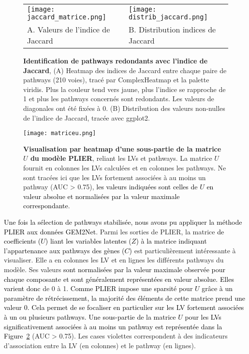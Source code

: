 \documentclass[twoside]{article}
\newcommand{\AR}[1]{\textcolor{black}{#1}}
\begin{document}
    \begin{figure}[!h]
    \centering
        \begin{tabular}{p{100mm}p{70mm}}
        \texttt{[image: jaccard\_matrice.png]} &
        \texttt{[image: distrib\_jaccard.png]} \\
        \centering A. Valeurs de l'indice de Jaccard & \centering B. Distribution indices de Jaccard\\[6pt]
        \end{tabular}
        \caption[Identification de pathways redondants avec l'indice de Jaccard]{\textbf{Identification de pathways redondants avec l'indice de Jaccard}, (A) Heatmap des indices de Jaccard entre chaque paire de pathways (210 voies), tracé par ComplexHeatmap \cite{gu_complex_2016} et la palette viridis. Plus la couleur tend vers jaune, plus l'indice se rapproche de 1 et plus les pathways concernés sont redondants. Les valeurs de diagonales ont été fixées à 0. (B) Distribution des valeurs non-nulles de l'indice de Jaccard, tracée avec ggplot2. \label{fig:jacc}}
    \end{figure}

    \begin{figure}[!h]
    \centering
        \texttt{[image: matriceu.png]}
        \caption[Coefficients PLIER liant les variables latentes aux pathways]{\textbf{Visualisation par heatmap d'une sous-partie de la matrice $U$ du modèle PLIER}, reliant les LVs et pathways. La matrice $U$ fournit en colonnes les LVs calculées et en colonnes les pathways. Ne sont tracées ici que les LVs fortement associées à au moins un pathway (AUC > 0.75), \AR{les valeurs indiquées sont celles de $U$ en valeur absolue et normalisées par la valeur maximale correspondante}.\label{fig:u}}
    \end{figure}

\vspace{0.2cm}\AR{Une fois la sélection de pathways stabilisée, nous avons pu appliquer la méthode PLIER aux données GEM2Net}. Parmi les sorties de PLIER, la matrice \AR{de coefficients ($U$) liant les variables latentes ($Z$) à la matrice indiquant l'appartenance aux pathways des gènes ($C$)} est particulièrement intéressante à visualiser. Elle a en colonnes les LV  et en lignes les différents pathways du modèle. Ses valeurs \AR{sont normalisées par la valeur maximale observée pour chaque composante et sont généralement représentées en valeur absolue. Elles varient donc} de 0 à 1. \AR{Comme PLIER impose une sparsité pour $U$ grâce à un paramètre de rétrécissement, la majorité des éléments de cette matrice prend une valeur 0. Cela permet de se focaliser en particulier sur les LV fortement associées à un ou plusieurs pathways. Une sous-partie de la matrice $U$ pour les LVs significativement associées à au moins un pathway est représentée dans la Figure~\ref{fig:u}} (AUC > 0.75). Les cases violettes correspondent à des indicateurs d'association entre la LV (en colonnes) et le pathway (en lignes). 
\end{document}
